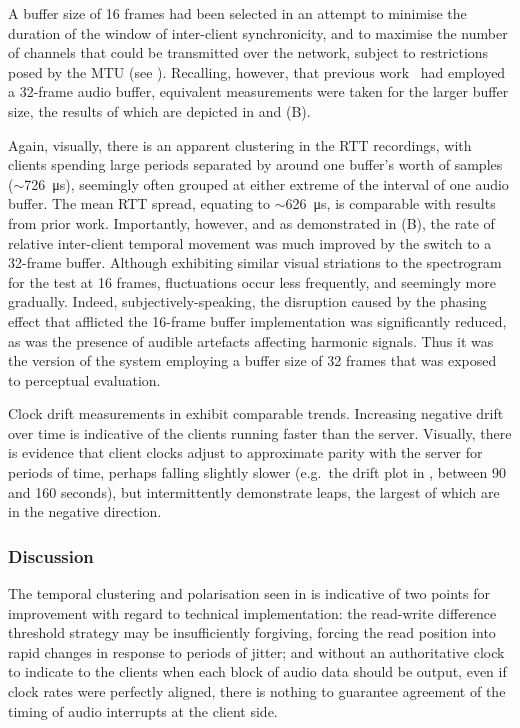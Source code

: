 A buffer size of 16 frames had been selected in an attempt to minimise the
duration of the window of inter-client synchronicity, and to maximise the
number of channels that could be transmitted over the network, subject to
restrictions posed by the MTU (see
).
Recalling, however, that previous
work~\citep{rushton_microcontroller-based_2023}
had employed a 32-frame audio buffer, equivalent measurements were taken for
the larger buffer size, the results of which are depicted in
 and (B).

Again, visually, there is an apparent clustering in the RTT recordings, with
clients spending large periods separated by around one buffer's worth of
samples ($\sim$\qty{726}{\us}), seemingly often grouped at either
extreme of the interval of one audio buffer.
The mean RTT spread, equating to $\sim$\qty{626}{\us}, is comparable with
results from prior work.
Importantly, however, and as demonstrated in (B), the
rate of relative inter-client temporal movement was much improved by the switch
to a 32-frame buffer.
Although exhibiting similar visual striations to the spectrogram for the test
at 16 frames, fluctuations occur less frequently, and seemingly more
gradually.
Indeed, subjectively-speaking, the disruption caused by the phasing effect
that afflicted the 16-frame buffer implementation was significantly reduced,
as was the presence of audible artefacts affecting harmonic signals.
Thus it was the version of the system employing a buffer size of 32 frames
that was exposed to perceptual evaluation.

Clock drift measurements in  exhibit
comparable trends.
Increasing negative drift over time is indicative of the clients running faster
than the server.
Visually, there is evidence that client clocks adjust to approximate parity
with the server for periods of time, perhaps falling slightly slower (e.g.\
the drift plot in , between 90 and 160 seconds), but
intermittently demonstrate leaps, the largest of which are in the negative
direction.

\subsubsection{Discussion}\label{subsubsec:discussion-tech}

The temporal clustering and polarisation seen in
 is indicative of two points for
improvement with regard to technical implementation:
the read-write difference threshold strategy may be insufficiently forgiving,
forcing the read position into rapid changes in response to periods of jitter;
and without an authoritative clock to indicate to the clients when each block of
audio data should be output, even if clock rates were perfectly aligned, there
is nothing to guarantee agreement of the timing of audio interrupts at the
client side.

